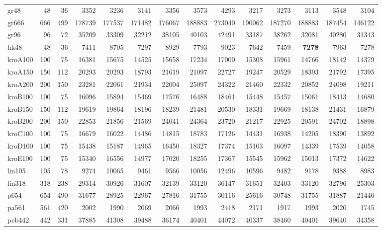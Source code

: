{\begin{longtable}{l r r r r r r r r r r r r r}
gr48 & 48 & 36 & 3352 & 3236 & 3141 & 3356 & 3573 & 4293 & 3217 & 3273 & 3113 & 3548 & 3104 \\
gr666 & 666 & 499 & 178739 & 177537 & 171482 & 176067 & 188883 & 273040 & 190062 & 187270 & 188883 & 187454 & 146122 \\
gr96 & 96 & 72 & 35209 & 33309 & 32212 & 38105 & 40103 & 42491 & 33187 & 38262 & 32081 & 40280 & 31343 \\
hk48 & 48 & 36 & 7411 & 8705 & 7297 & 8929 & 7793 & 9023 & 7642 & 7459 & \textbf{7278} & 7963 & 7278 \\
kroA100 & 100 & 75 & 16381 & 15675 & 14525 & 15658 & 17234 & 17000 & 15308 & 15961 & 14766 & 18142 & 14379 \\
kroA150 & 150 & 112 & 20293 & 20293 & 18793 & 21619 & 21097 & 22727 & 19247 & 20529 & 18393 & 21792 & 17395 \\
kroA200 & 200 & 150 & 23281 & 22061 & 21934 & 22004 & 25097 & 24322 & 21460 & 22332 & 20852 & 24098 & 19211 \\
kroB100 & 100 & 75 & 16096 & 15894 & 15469 & 17576 & 16488 & 18461 & 15448 & 15457 & 15061 & 18413 & 14680 \\
kroB150 & 150 & 112 & 19619 & 19864 & 18196 & 18239 & 21481 & 20530 & 18331 & 19669 & 18138 & 21431 & 16879 \\
kroB200 & 200 & 150 & 22853 & 21856 & 21569 & 24041 & 24364 & 23720 & 21217 & 22925 & 20591 & 24702 & 18898 \\
kroC100 & 100 & 75 & 16679 & 16022 & 14486 & 14815 & 18783 & 17126 & 14431 & 16938 & 14205 & 18390 & 13892 \\
kroD100 & 100 & 75 & 15438 & 15187 & 14965 & 16450 & 18327 & 17374 & 15103 & 16097 & 14339 & 17539 & 14058 \\
kroE100 & 100 & 75 & 15340 & 16556 & 14977 & 17020 & 18255 & 17367 & 15545 & 15962 & 15013 & 17372 & 14622 \\
lin105 & 105 & 78 & 9274 & 10065 & 9461 & 9566 & 10056 & 12496 & 10596 & 9482 & 9178 & 9388 & 8983 \\
lin318 & 318 & 238 & 29314 & 30926 & 31607 & 32139 & 33120 & 36147 & 31651 & 32403 & 33120 & 32796 & 25303 \\
p654 & 654 & 490 & 31677 & 28925 & 22967 & 27816 & 31755 & 30116 & 25616 & 30748 & 31755 & 31887 & 21446 \\
pa561 & 561 & 420 & 2002 & 1990 & 2069 & 2066 & 1993 & 2418 & 2171 & 1917 & 1993 & 2020 & 1745 \\
pcb442 & 442 & 331 & 37885 & 41308 & 39488 & 36174 & 40401 & 44072 & 40337 & 38460 & 40401 & 39640 & 34358 \\

\end{longtable}}

